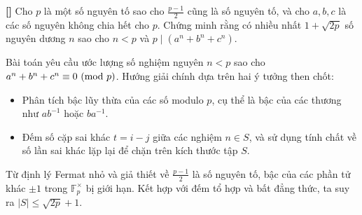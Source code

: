 \documentclass[../05-modular-arithmetic-a.tex]{subfiles}
\begin{document}
\begin{example*}\label{example:CAN-2015-MO-P5}\textbf{[]}
	Cho \( p \) là một số nguyên tố sao cho \( \frac{p - 1}{2} \) cũng là số nguyên tố, và cho \( a, b, c \) là các số nguyên không chia hết cho \( p \).
	Chứng minh rằng có nhiều nhất \( 1 + \sqrt{2p} \) số nguyên dương \( n \) sao cho \( n < p \) và \( p \mid (a^n + b^n + c^n) \).
\end{example*}

\begin{story*}
    Bài toán yêu cầu ước lượng số nghiệm nguyên \( n < p \) sao cho \( a^n + b^n + c^n \equiv 0 \ (\mathrm{mod}\ p) \).  
    Hướng giải chính dựa trên hai ý tưởng then chốt:
    
    \begin{itemize}[topsep=0pt, partopsep=0pt, itemsep=0pt]
        \item Phân tích bậc lũy thừa của các số modulo \( p \), cụ thể là bậc của các thương như \( ab^{-1} \) hoặc \( ba^{-1} \).
        \item Đếm số cặp sai khác \( t = i - j \) giữa các nghiệm \( n \in S \), và sử dụng tính chất về số lần sai khác lặp lại để chặn trên kích thước tập \( S \).
    \end{itemize}

    Từ định lý Fermat nhỏ và giả thiết về \( \frac{p-1}{2} \) là số nguyên tố, bậc của các phần tử khác \( \pm 1 \) trong \( \mathbb{F}_p^\times \) bị giới hạn.  
    Kết hợp với đếm tổ hợp và bất đẳng thức, ta suy ra \( |S| \le \sqrt{2p} + 1 \).
\end{story*}

\bigbreak
\end{document}
